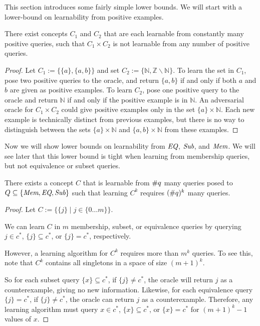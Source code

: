 This section introduces some fairly simple lower bounds.
We will start with a lower-bound on learnability from positive examples. 

\begin{proposition}
There exist concepts $C_1$ and $C_2$ that are each learnable from constantly many positive queries, such that $C_1 \times C_2$ is not learnable from any number of positive queries. 
\end{proposition}
\begin{proof}
Let $C_1 := \{ \{a\}, \{a,b\} \}$ and set $C_2 := \{ \mathbb{N}, \mathbb{Z} \backslash \mathbb{N} \}$. 
To learn the set in $C_1$, pose two positive queries to the oracle, and return $\{a,b\}$ if and only if both $a$ and $b$ are given as positive examples. 
To learn $C_2$, pose one positive query to the oracle and return $\mathbb{N}$ if and only if the positive example is in $\mathbb{N}$. 
An adversarial oracle for $C_1 \times C_2$ could give positive examples only in the set $\{a\} \times \mathbb{N}$. 
Each new example is technically distinct from previous examples, but there is no way to distinguish between the sets $\{a\}\times \mathbb{N}$ and $\{a,b\} \times \mathbb{N}$ from these examples. 
\end{proof}

Now we will show lower bounds on learnability from $\emph{EQ}$, $\emph{Sub}$, and $\emph{Mem}$. 
We will see later that this lower bound is tight when learning from membership queries, but not equivalence or subset queries.


\begin{proposition}
There exists a concept $C$ that is learnable from $\#q$ many queries posed to $Q \subseteq \{ \emph{Mem}, \emph{EQ}, \emph{Sub} \}$ such that learning $C^k$ requires $(\#q)^k$ many queries.   
\end{proposition}
\begin{proof}
Let $C := \{ \{j\} \mid j \in \{0 \dots m\} \}$. 

We can learn $C$ in $m$ membership, subset, or equivalence queries by querying $j \in c^*$, $\{ j \} \subseteq c^*$, or $\{j\} = c^*$, respectively. 

However, a learning algorithm for $C^k$ requires more than $m^k$ queries. 
To see this, note that  $C^k$ contains all singletons in a space of size $(m+1)^k$. 

So for each subset query $\{x\} \subseteq c^*$, if $\{j\} \ne c^*$, the oracle will return $j$ as a counterexample, giving no new information.  
Likewise, for each equivalence query $\{j\} = c^*$, if $\{j\} \ne c^*$, the oracle can return $j$ as a counterexample.
Therefore, any learning algorithm must query $x \in c^*$, $\{ x \} \subseteq c^*$, or $\{x\} = c^*$ for $(m+1)^k - 1$ values of $x$.
\end{proof}
